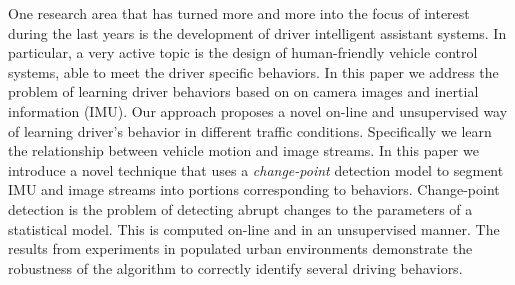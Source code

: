 One research area that has turned more and more into the focus of interest
during the last years is the development of driver intelligent assistant
systems. In particular, a very active topic is the design of human-friendly
vehicle control systems, able to meet the driver specific behaviors. In this
paper we address the problem of learning driver behaviors based on on camera
images and inertial information (IMU). Our approach proposes a novel on-line and
unsupervised way of learning driver's behavior in different traffic conditions.
Specifically we learn the relationship between vehicle motion and image streams.
In this paper we introduce a novel technique that uses a \textit{change-point}
detection model to segment IMU and image streams into portions corresponding to
behaviors. Change-point detection is the problem of detecting abrupt changes to
the parameters of a statistical model. This is computed on-line and in an
unsupervised manner. The results from experiments in populated urban
environments demonstrate the robustness of the algorithm to correctly identify
several driving behaviors.

